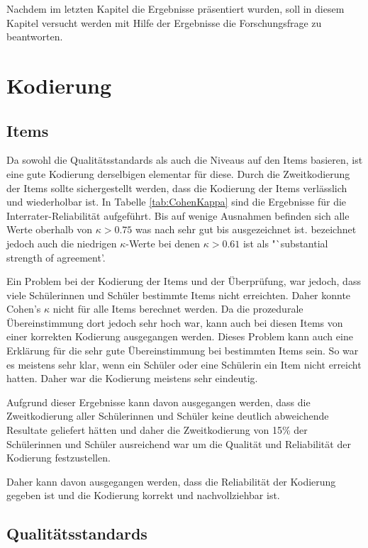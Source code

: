 

Nachdem im letzten Kapitel die Ergebnisse präsentiert wurden, soll in diesem Kapitel versucht werden mit Hilfe der Ergebnisse die Forschungsfrage zu beantworten.

\section{Kodierung}

\subsection{Items}

Da sowohl die Qualitätsstandards als auch die Niveaus auf den Items basieren, ist eine gute Kodierung derselbigen elementar für diese. Durch die Zweitkodierung der Items sollte sichergestellt werden, dass die Kodierung der Items verlässlich und wiederholbar ist. In Tabelle \ref{tab:CohenKappa} sind die Ergebnisse für die Interrater-Reliabilität aufgeführt. Bis auf wenige Ausnahmen befinden sich alle Werte oberhalb von $\kappa > 0.75$ was nach \citet[S.111]{Greve1997} sehr gut bis ausgezeichnet ist. \citet{Landis1977} bezeichnet jedoch auch die niedrigen $\kappa$-Werte bei denen $\kappa > 0.61$ ist als "`substantial strength of agreement'. 

Ein Problem bei der Kodierung der Items und der Überprüfung, war jedoch, dass viele Schülerinnen und Schüler bestimmte Items nicht erreichten. Daher konnte Cohen's $\kappa$ nicht für alle Items berechnet werden. Da die prozedurale Übereinstimmung dort jedoch sehr hoch war, kann auch bei diesen Items von einer korrekten Kodierung ausgegangen werden. Dieses Problem kann auch eine Erklärung für die sehr gute Übereinstimmung bei bestimmten Items sein. So war es meistens sehr klar, wenn ein Schüler oder eine Schülerin ein Item nicht erreicht hatten. Daher war die Kodierung meistens sehr eindeutig.

Aufgrund dieser Ergebnisse kann davon ausgegangen werden, dass die Zweitkodierung aller Schülerinnen und Schüler keine deutlich abweichende Resultate geliefert hätten und daher die Zweitkodierung von 15\% der Schülerinnen und Schüler ausreichend war um die Qualität und Reliabilität der Kodierung festzustellen.

Daher kann davon ausgegangen werden, dass die Reliabilität der Kodierung gegeben ist und die Kodierung korrekt und nachvollziehbar ist.

\subsection{Qualitätsstandards}

